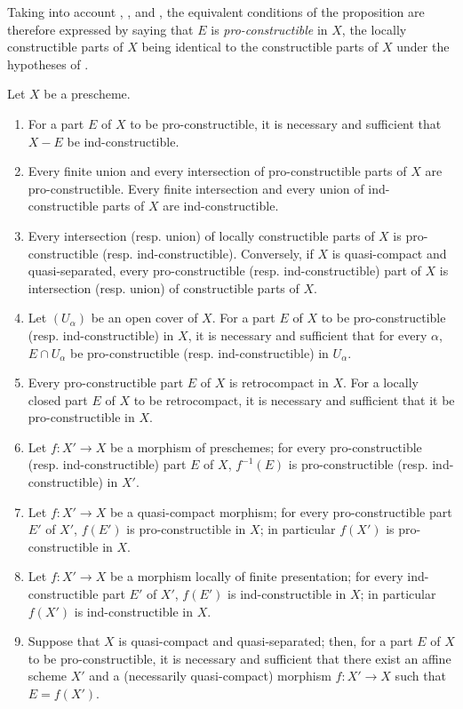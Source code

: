 Taking into account , , and , the equivalent conditions of the proposition  are therefore expressed by saying that $E$ is \emph{pro-constructible} in $X$, the locally constructible parts of $X$ being identical to the constructible parts of $X$ under the hypotheses of .


\begin{proposition}[1.9.5]
\label{IV.1.9.5}
Let $X$ be a prescheme.
\begin{enumerate}
  \item[\rm(i)] For a part $E$ of $X$ to be pro-constructible, it is necessary and sufficient that $X-E$ be ind-constructible.
  \item[\rm(ii)] Every finite union and every intersection of pro-constructible parts of $X$ are pro-constructible.
  Every finite intersection and every union of ind-constructible parts of $X$ are ind-constructible.
  \item[\rm(iii)] Every intersection (resp. union) of locally constructible parts of $X$ is pro-constructible (resp. ind-constructible).
  Conversely, if $X$ is quasi-compact and quasi-separated, every pro-constructible (resp. ind-constructible) part of $X$ is intersection (resp. union) of constructible parts of $X$.
  \item[\rm(iv)] Let $(U_\alpha)$ be an open cover of $X$.
  For a part $E$ of $X$ to be pro-constructible (resp. ind-constructible) in $X$, it is necessary and sufficient that for every $\alpha$, $E\cap U_\alpha$ be pro-constructible (resp. ind-constructible) in $U_\alpha$.
  \item[\rm(v)] Every pro-constructible part $E$ of $X$ is retrocompact in $X$.
  For a locally closed part $E$ of $X$ to be retrocompact, it is necessary and sufficient that it be pro-constructible in $X$.
  \item[\rm(vi)] Let $f:X'\to X$ be a morphism of preschemes; for every pro-constructible (resp. ind-constructible) part $E$ of $X$, $f^{-1}(E)$ is pro-constructible (resp. ind-constructible) in $X'$.
  \item[\rm(vii)] Let $f:X'\to X$ be a quasi-compact morphism; for every pro-constructible part $E'$ of $X'$, $f(E')$ is pro-constructible in $X$; in particular $f(X')$ is pro-constructible in $X$.
  \item[\rm(viii)] Let $f:X'\to X$ be a morphism locally of finite presentation; for every ind-constructible part $E'$ of $X'$, $f(E')$ is ind-constructible in $X$; in particular $f(X')$ is ind-constructible in $X$.
  \item[\rm(ix)] Suppose that $X$ is quasi-compact and quasi-separated; then, for a part $E$ of $X$ to be pro-constructible, it is necessary and sufficient that there exist an affine scheme $X'$ and a (necessarily quasi-compact) morphism $f:X'\to X$ such that $E=f(X')$.
\end{enumerate}
\end{proposition}

